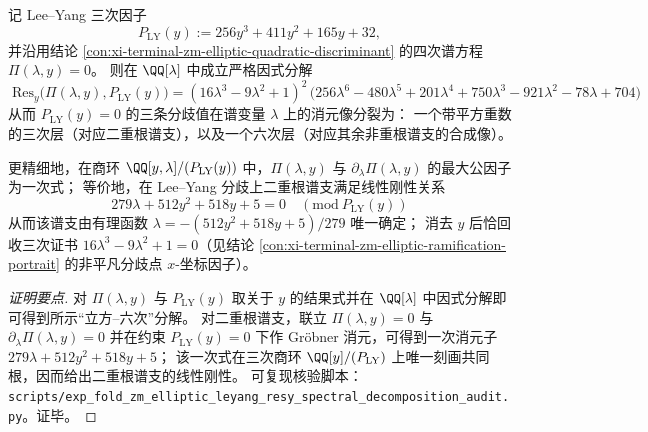 \begin{conclusion}\label{con:xi-terminal-zm-leyang-resy-spectral-decomposition}
记 Lee--Yang 三次因子
\[
P_{\mathrm{LY}}(y):=256y^{3}+411y^{2}+165y+32,
\]
并沿用结论 \ref{con:xi-terminal-zm-elliptic-quadratic-discriminant} 的四次谱方程 \(\Pi(\lambda,y)=0\)。
则在 \(\QQ[\lambda]\) 中成立严格因式分解
\[
\boxed{\;
\mathrm{Res}_{y}\bigl(\Pi(\lambda,y),P_{\mathrm{LY}}(y)\bigr)
=(16\lambda^{3}-9\lambda^{2}+1)^{2}\,
\bigl(256\lambda^{6}-480\lambda^{5}+201\lambda^{4}+750\lambda^{3}-921\lambda^{2}-78\lambda+704\bigr)\;}
\]
从而 \(P_{\mathrm{LY}}(y)=0\) 的三条分歧值在谱变量 \(\lambda\) 上的消元像分裂为：
一个带平方重数的三次层（对应二重根谱支），以及一个六次层（对应其余非重根谱支的合成像）。
\par
更精细地，在商环 \(\QQ[y,\lambda]/(P_{\mathrm{LY}}(y))\) 中，\(\Pi(\lambda,y)\) 与 \(\partial_{\lambda}\Pi(\lambda,y)\) 的最大公因子为一次式；
等价地，在 Lee--Yang 分歧上二重根谱支满足线性刚性关系
\[
\boxed{\;
279\lambda+512y^{2}+518y+5=0\quad(\mathrm{mod}\ P_{\mathrm{LY}}(y))\;}
\]
从而该谱支由有理函数 \(\lambda=-(512y^{2}+518y+5)/279\) 唯一确定；
消去 \(y\) 后恰回收三次证书 \(16\lambda^{3}-9\lambda^{2}+1=0\)（见结论 \ref{con:xi-terminal-zm-elliptic-ramification-portrait} 的非平凡分歧点 \(x\)-坐标因子）。
\end{conclusion}
\begin{proof}[证明要点]
对 \(\Pi(\lambda,y)\) 与 \(P_{\mathrm{LY}}(y)\) 取关于 \(y\) 的结果式并在 \(\QQ[\lambda]\) 中因式分解即可得到所示“立方--六次”分解。
对二重根谱支，联立
\(
\Pi(\lambda,y)=0
\)
与
\(
\partial_{\lambda}\Pi(\lambda,y)=0
\)
并在约束 \(P_{\mathrm{LY}}(y)=0\) 下作 Gröbner 消元，可得到一次消元子
\(
279\lambda+512y^{2}+518y+5
\)；
该一次式在三次商环 \(\QQ[y]/(P_{\mathrm{LY}})\) 上唯一刻画共同根，因而给出二重根谱支的线性刚性。
可复现核验脚本：\texttt{scripts/exp\_fold\_zm\_elliptic\_leyang\_resy\_spectral\_decomposition\_audit.py}。证毕。
\end{proof}

